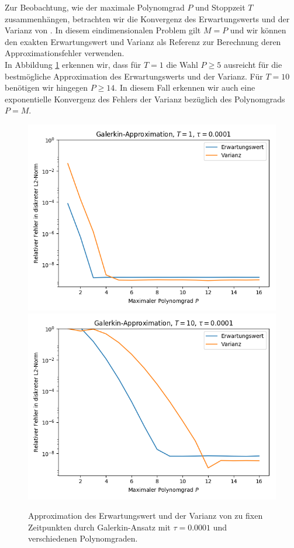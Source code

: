 Zur Beobachtung, wie der maximale Polynomgrad $P$ und Stoppzeit $T$ zusammenhängen, betrachten wir die Konvergenz des Erwartungswerts und der Varianz von . In diesem eindimensionalen Problem gilt $M=P$ und wir können den exakten Erwartungswert und Varianz als Referenz zur Berechnung deren Approximationsfehler verwenden.\\
In Abbildung \ref{fig:galerkin_bydegree_trial1} erkennen wir, dass für $T=1$ die Wahl $P\ge 5$ ausreicht für die bestmögliche Approximation des Erwartungswerts und der Varianz. Für $T=10$ benötigen wir hingegen $P\ge 14$. In diesem Fall erkennen wir auch eine exponentielle Konvergenz des Fehlers der Varianz bezüglich des Polynomgrads $P=M$.
\begin{figure}[!htb]
  \includegraphics[width=\linewidth]{Figures/galerkin_bydegree_trial1_t1.png}
\endminipage
{}
  \includegraphics[width=\linewidth]{Figures/galerkin_bydegree_trial1_t10.png}
\endminipage
  \caption{Approximation des Erwartungswert und der Varianz von  zu fixen Zeitpunkten durch Galerkin-Ansatz mit $\tau=0.0001$ und verschiedenen Polynomgraden.}
  \label{fig:galerkin_bydegree_trial1}
\end{figure}
